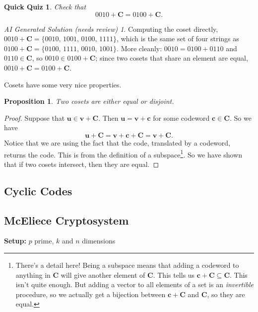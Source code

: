 \documentclass{article}
\theoremstyle{plain}
\newtheorem{proposition}[theorem]{Proposition}
\newtheorem{quiz}[theorem]{Quick Quiz}
\theoremstyle{definition}
\theoremstyle{remark}
\newtheorem*{aisolution}{AI Generated Solution (needs review)}
\numberwithin{theorem}{section}
\begin{document}
\begin{quiz}
    Check that
\[
0010+\mathbf{C} = 0100+\mathbf{C}.
\]
\end{quiz}
\begin{aisolution}
Computing the coset directly, $0010 + \mathbf{C} = \{0010,\,1001,\,0100,\,1111\}$, which is the same set of four strings as $0100 + \mathbf{C} = \{0100,\,1111,\,0010,\,1001\}$.  More cleanly: $0010 = 0100 + 0110$ and $0110 \in \mathbf{C}$, so $0010 \in 0100 + \mathbf{C}$; since two cosets that share an element are equal, $0010 + \mathbf{C} = 0100 + \mathbf{C}$.
\end{aisolution}

Cosets have some very nice properties.

\begin{proposition}
    Two cosets are either equal or disjoint.
\end{proposition}

\begin{proof}
    Suppose that $\mathbf{u} \in \mathbf{v} + \mathbf{C}$.  Then $\mathbf{u} = \mathbf{v} + \mathbf{c}$ for some codeword $\mathbf{c} \in \mathbf{C}$.  So we have
    \[
    \mathbf{u} + \mathbf{C} = 
    \mathbf{v} + \mathbf{c} + \mathbf{C} = \mathbf{v} + \mathbf{C}.
    \]
    Notice that we are using the fact that the code, translated by a codeword, returns the code.  This is from the definition of a subspace\footnote{There's a detail here!  Being a subspace means that adding a codeword to anything in $\mathbf{C}$ will give another element of $\mathbf{C}$.  This tells us $\mathbf{c} + \mathbf{C} \subseteq \mathbf{C}$.  This isn't quite enough.  But adding a vector to all elements of a set is an \emph{invertible} procedure, so we actually get a bijection between $\mathbf{c}+\mathbf{C}$ and $\mathbf{C}$, so they are equal.}.
    So we have shown that if two cosets intersect, then they are equal.
\end{proof}




\subsection{Cyclic Codes}

\subsection{McEliece Cryptosystem}


     {\bf Setup:}  $p$ prime, $k$ and $n$ dimensions
     \vspace{1em}
\end{document}
